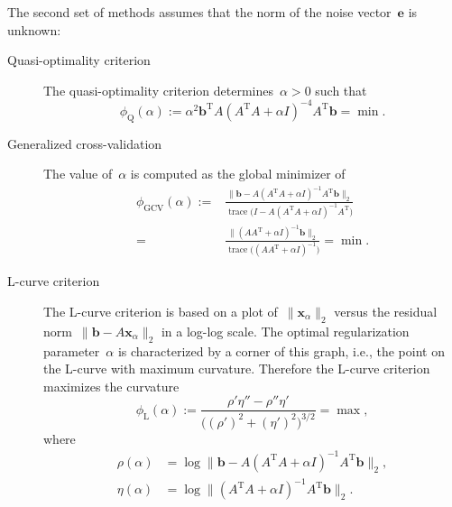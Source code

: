 \documentclass[a4paper,10pt]{amsart}
\newcommand{\trans}[1]{{#1}^{\text{T}}}      %
\renewcommand{\vec}[1]{\mathbf{\boldsymbol{#1}}}
\DeclareMathOperator{\trace}{trace}
\begin{document}
The second set of methods assumes that the norm of the
noise vector~$\vec{e}$ is unknown:
\begin{description}
  \item[Quasi-optimality criterion]
    The quasi-optimality criterion determines~${\alpha > 0}$ such that
    \begin{equation*}
      \phi_{\text{Q}} (\alpha) :=
      \alpha^2 \trans{\vec{b}} A (\trans{A} A + \alpha I)^{-4}
               \trans{A} \vec{b} = \min.
    \end{equation*}

  \item[Generalized cross-validation]
    The value of~$\alpha$ is computed as the global minimizer of
    \begin{align*}
      \phi_{\text{GCV}} (\alpha) := {} &
        \frac{\| \vec{b} - A (\trans{A} A + \alpha I)^{-1}
                           \trans{A} \vec{b} \|_2}
             {\trace \bigl( I - A (\trans{A} A + \alpha I)^{-1}
                                \trans{A} \bigr)}                         \\
      {} = {} &
        \frac{\| (A \trans{A} + \alpha I)^{-1} \vec{b} \|_2}
             {\trace \bigl( (A \trans{A} + \alpha I)^{-1} \bigr)} = \min.
    \end{align*}

  \item[L-curve criterion]
    The L-curve criterion is based on a plot
    of~${\| \vec{x}_\alpha \|_2}$
    versus the residual norm~${\| \vec{b} - A \vec{x}_\alpha \|_2}$
    in a log-log scale.
    The optimal regularization parameter~$\alpha$ is characterized by 
    a corner of this graph, i.e.,
    the point on the L-curve with maximum curvature.
    Therefore the L-curve criterion maximizes the curvature
    \begin{equation*}
      \phi_{\text{L}} (\alpha) :=
        \frac{\rho' \eta'' - \rho'' \eta'}
             {\bigl( (\rho')^2 + (\eta')^2 \bigr)^{3/2}} = \max,
    \end{equation*}
    where
    \begin{align*}
      \rho (\alpha) & {} = \log \| \vec{b} - A (\trans{A} A + \alpha I)^{-1}
                                             \trans{A} \vec{b} \|_2,         \\
      \eta (\alpha) & {} = \log \| (\trans{A} A + \alpha I)^{-1}
                                   \trans{A} \vec{b} \|_2.
    \end{align*}

\end{description}
\end{document}
